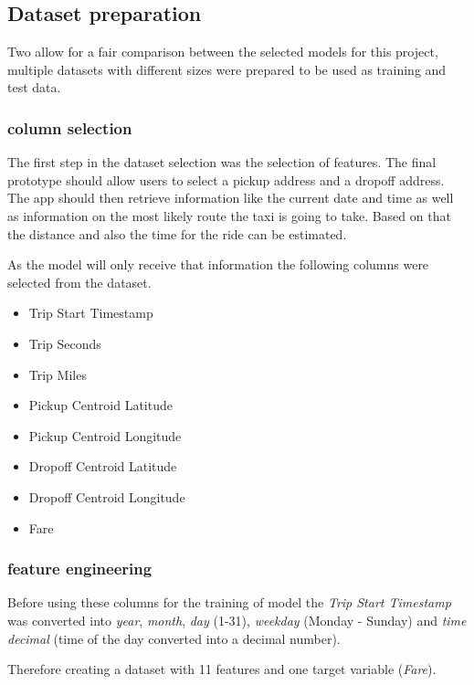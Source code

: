 \documentclass[
  letterpaper,
  DIV=11,
  numbers=noendperiod]{scrartcl}
\begin{document}
\subsection{Dataset preparation}\label{dataset-preparation}

Two allow for a fair comparison between the selected models for this
project, multiple datasets with different sizes were prepared to be used
as training and test data.

\subsubsection{column selection}\label{column-selection}

The first step in the dataset selection was the selection of features.
The final prototype should allow users to select a pickup address and a
dropoff address. The app should then retrieve information like the
current date and time as well as information on the most likely route
the taxi is going to take. Based on that the distance and also the time
for the ride can be estimated.

As the model will only receive that information the following columns
were selected from the dataset.

\begin{itemize}
\item
  Trip Start Timestamp
\item
  Trip Seconds
\item
  Trip Miles
\item
  Pickup Centroid Latitude
\item
  Pickup Centroid Longitude
\item
  Dropoff Centroid Latitude
\item
  Dropoff Centroid Longitude
\item
  Fare
\end{itemize}

\subsubsection{feature engineering}\label{feature-engineering}

Before using these columns for the training of model the \emph{Trip
Start Timestamp} was converted into \emph{year}, \emph{month},
\emph{day} (1-31), \emph{weekday} (Monday - Sunday) and \emph{time
decimal} (time of the day converted into a decimal number).

Therefore creating a dataset with 11 features and one target variable
(\emph{Fare}).
\end{document}
